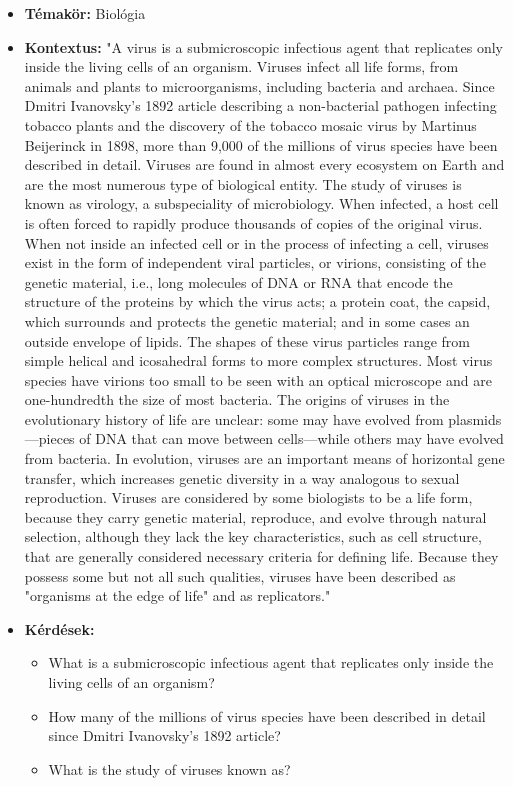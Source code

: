 \begin{itemize}
\hrule	
	
\item \textbf{Témakör:} Biológia
\item \textbf{Kontextus:} "A virus is a submicroscopic infectious agent that replicates only inside the living cells of an organism. Viruses infect all life forms, from animals and plants to microorganisms, including bacteria and archaea. Since Dmitri Ivanovsky's 1892 article describing a non-bacterial pathogen infecting tobacco plants and the discovery of the tobacco mosaic virus by Martinus Beijerinck in 1898, more than 9,000 of the millions of virus species have been described in detail. Viruses are found in almost every ecosystem on Earth and are the most numerous type of biological entity. The study of viruses is known as virology, a subspeciality of microbiology. When infected, a host cell is often forced to rapidly produce thousands of copies of the original virus. When not inside an infected cell or in the process of infecting a cell, viruses exist in the form of independent viral particles, or virions, consisting of the genetic material, i.e., long molecules of DNA or RNA that encode the structure of the proteins by which the virus acts; a protein coat, the capsid, which surrounds and protects the genetic material; and in some cases  an outside envelope of lipids. The shapes of these virus particles range from simple helical and icosahedral forms to more complex structures. Most virus species have virions too small to be seen with an optical microscope and are one-hundredth the size of most bacteria. The origins of viruses in the evolutionary history of life are unclear: some may have evolved from plasmids—pieces of DNA that can move between cells—while others may have evolved from bacteria. In evolution, viruses are an important means of horizontal gene transfer, which increases genetic diversity in a way analogous to sexual reproduction. Viruses are considered by some biologists to be a life form, because they carry genetic material, reproduce, and evolve through natural selection, although they lack the key characteristics, such as cell structure, that are generally considered necessary criteria for defining life. Because they possess some but not all such qualities, viruses have been described as "organisms at the edge of life" and as replicators."
\item \textbf{Kérdések:} 
	\begin{itemize}
		\item What is a submicroscopic infectious agent that replicates only inside the living cells of an organism?
		\item How many of the millions of virus species have been described in detail since Dmitri Ivanovsky's 1892 article?
		\item What is the study of viruses known as?
	\end{itemize}


\end{itemize}
